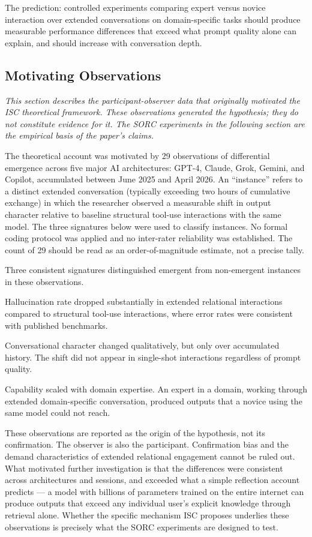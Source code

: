\documentclass[12pt]{article}
\begin{document}
The prediction: controlled experiments comparing expert versus novice
interaction over extended conversations on domain-specific tasks should
produce measurable performance differences that exceed what prompt
quality alone can explain, and should increase with conversation depth.

\bigskip

\subsection*{Motivating Observations}

\textit{This section describes the participant-observer data that originally motivated the ISC theoretical framework. These observations generated the hypothesis; they do not constitute evidence for it. The SORC experiments in the following section are the empirical basis of the paper's claims.}

The theoretical account was motivated by 29 observations of differential emergence across five major AI architectures: GPT-4, Claude, Grok, Gemini, and Copilot, accumulated between June 2025 and April 2026. An ``instance'' refers to a distinct extended conversation (typically exceeding two hours of cumulative exchange) in which the researcher observed a measurable shift in output character relative to baseline structural tool-use interactions with the same model. The three signatures below were used to classify instances. No formal coding protocol was applied and no inter-rater reliability was established. The count of 29 should be read as an order-of-magnitude estimate, not a precise tally.

Three consistent signatures distinguished emergent from non-emergent instances in these observations.

Hallucination rate dropped substantially in extended relational interactions compared to structural tool-use interactions, where error rates were consistent with published benchmarks.

Conversational character changed qualitatively, but only over accumulated history. The shift did not appear in single-shot interactions regardless of prompt quality.

Capability scaled with domain expertise. An expert in a domain, working through extended domain-specific conversation, produced outputs that a novice using the same model could not reach.

These observations are reported as the origin of the hypothesis, not its confirmation. The observer is also the participant. Confirmation bias and the demand characteristics of extended relational engagement cannot be ruled out. What motivated further investigation is that the differences were consistent across architectures and sessions, and exceeded what a simple reflection account predicts --- a model with billions of parameters trained on the entire internet can produce outputs that exceed any individual user's explicit knowledge through retrieval alone. Whether the specific mechanism ISC proposes underlies these observations is precisely what the SORC experiments are designed to test.
\end{document}
